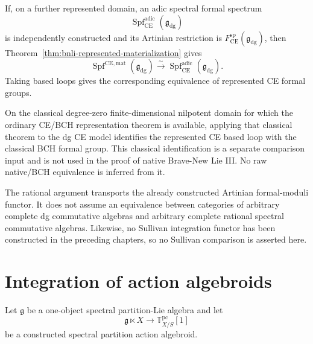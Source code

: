 \begin{proposition}
\label{prop:bnli-adic-ce-comparison}
If, on a further represented domain, an adic spectral formal spectrum
\[
    \operatorname{Spf}^{\mathrm{adic}}_{
      \mathrm{CE}}(\mathfrak g_{\mathrm{dg}})
\]
is independently constructed and its Artinian restriction is
$F^{\mathrm{sp}}_{\mathrm{CE}}(\mathfrak g_{\mathrm{dg}})$, then
Theorem~\ref{thm:bnli-represented-materialization} gives
\[
\boxed{
    \operatorname{Spf}^{\mathrm{CE,mat}}(\mathfrak g_{\mathrm{dg}})
    \xrightarrow{\sim}
    \operatorname{Spf}^{\mathrm{adic}}_{\mathrm{CE}}
    (\mathfrak g_{\mathrm{dg}}).}
\]
Taking based loops gives the corresponding equivalence of represented CE
formal groups.
\end{proposition}

\begin{corollary}
\label{cor:bnli-bch-comparison}
On the classical degree-zero finite-dimensional nilpotent domain for which the
ordinary CE/BCH representation theorem is available, applying that classical
theorem to the dg CE model identifies the represented CE based loop with the
classical BCH formal group.  This classical identification is a separate
comparison input and is not used in the proof of native Brave-New Lie III.
No raw native/BCH equivalence is inferred from it.
\end{corollary}

\begin{remark}
The rational argument transports the already constructed Artinian
formal-moduli functor.  It does not assume an equivalence between categories
of arbitrary complete dg commutative algebras and arbitrary complete rational
spectral commutative algebras.  Likewise, no Sullivan integration functor has
been constructed in the preceding chapters, so no Sullivan comparison is
asserted here.
\end{remark}

\section{Integration of action algebroids}
\label{sec:bnli-action-integration}

Let $\mathfrak g$ be a one-object spectral partition-Lie algebra and let
\[
    \mathfrak g\ltimes X
    \longrightarrow
    \mathbb T^{\mathrm{pc}}_{X/S}[1]
\]
be a constructed spectral partition action algebroid.

